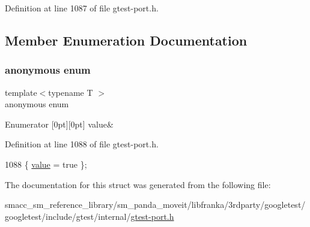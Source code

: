 Definition at line 1087 of file gtest-\/port.\+h.



\subsection{Member Enumeration Documentation}
\mbox{\label{structtesting_1_1internal_1_1StaticAssertTypeEqHelper_3_01T_00_01T_01_4_aaa74ade0039d54d90639af147e6bdbe5}} 
\subsubsection{\texorpdfstring{anonymous enum}{anonymous enum}}
{\footnotesize\ttfamily template$<$typename T $>$ \\
anonymous enum}

\begin{DoxyEnumFields}{Enumerator}
[0pt][0pt]{}\mbox{\label{structtesting_1_1internal_1_1StaticAssertTypeEqHelper_3_01T_00_01T_01_4_aaa74ade0039d54d90639af147e6bdbe5a63c475f543e4e977d43c5093dd2b7f3f}} 
value&\\
\hline

\end{DoxyEnumFields}


Definition at line 1088 of file gtest-\/port.\+h.


\begin{DoxyCode}
1088 \{ \hyperlink{structtesting_1_1internal_1_1StaticAssertTypeEqHelper_3_01T_00_01T_01_4_aaa74ade0039d54d90639af147e6bdbe5a63c475f543e4e977d43c5093dd2b7f3f}{value} = \textcolor{keyword}{true} \};
\end{DoxyCode}


The documentation for this struct was generated from the following file\+:\begin{DoxyCompactItemize}
\item 
smacc\+\_\+sm\+\_\+reference\+\_\+library/sm\+\_\+panda\+\_\+moveit/libfranka/3rdparty/googletest/googletest/include/gtest/internal/\hyperlink{gtest-port_8h}{gtest-\/port.\+h}\end{DoxyCompactItemize}
